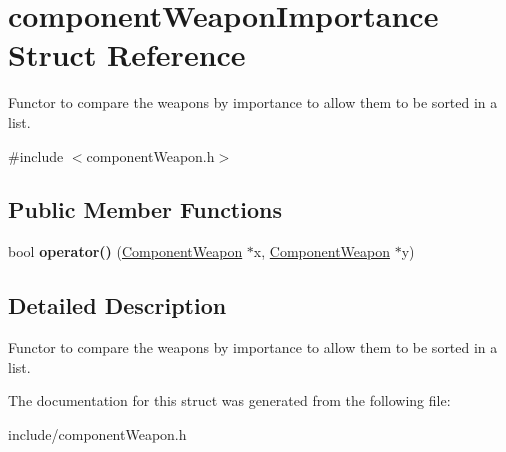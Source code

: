 \hypertarget{structcomponentWeaponImportance}{
\section{component\-Weapon\-Importance \-Struct \-Reference}
\label{da/d78/structcomponentWeaponImportance}
}


\-Functor to compare the weapons by importance to allow them to be sorted in a list.  




{\ttfamily \#include $<$component\-Weapon.\-h$>$}

\subsection*{\-Public \-Member \-Functions}
\begin{DoxyCompactItemize}
\item 
\hypertarget{structcomponentWeaponImportance_aa26070f39e4424415e4321135d6f8320}{
bool {\bfseries operator()} (\hyperlink{classComponentWeapon}{\-Component\-Weapon} $\ast$x, \hyperlink{classComponentWeapon}{\-Component\-Weapon} $\ast$y)}
\label{da/d78/structcomponentWeaponImportance_aa26070f39e4424415e4321135d6f8320}

\end{DoxyCompactItemize}


\subsection{\-Detailed \-Description}
\-Functor to compare the weapons by importance to allow them to be sorted in a list. 

\-The documentation for this struct was generated from the following file\-:\begin{DoxyCompactItemize}
\item 
include/component\-Weapon.\-h\end{DoxyCompactItemize}
